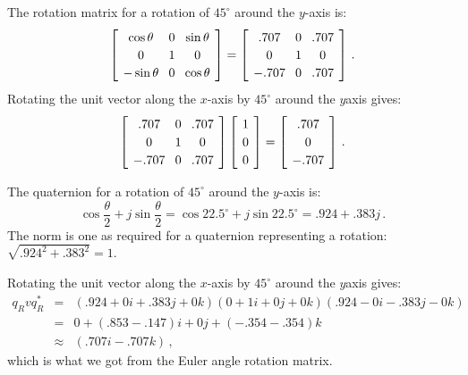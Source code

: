 \documentclass[11pt,a4paper]{report}
\newcommand*{\spacearray}{
\renewcommand{\arraystretch}{1.2}
\setlength{\arraycolsep}{4pt}
}
\begin{document}
\thispagestyle{empty}

The rotation matrix for a rotation of $45^\circ$ around the $y$-axis is:
\[
\spacearray
\left[\begin{array}{ccc}\cos\theta&0&\sin\theta\\0&1&0\\-\sin\theta&0&\cos\theta\\\end{array}\right]
=
\left[\begin{array}{ccc}.707&0&.707\\0&1&0\\-.707&0&.707\\\end{array}\right]\,.
\]
Rotating the unit vector along the $x$-axis by $45^\circ$ around the $y$axis gives:
\[
\spacearray
\left[\begin{array}{ccc}.707&0&.707\\0&1&0\\-.707&0&.707\\\end{array}\right]
\left[
\begin{array}{c}1\\0\\0\\\end{array}
\right]=
\left[
\begin{array}{c}.707\\0\\-.707\\\end{array}
\right]\,.
\]

The quaternion for a rotation of $45^\circ$ around the $y$-axis is:
\[
\cos\frac{\theta}{2} + j\sin\frac{\theta}{2}=\cos 22.5^\circ + j\sin 22.5^\circ= .924+.383j\,.
\]
The norm is one as required for a quaternion representing a rotation:
$\sqrt{.924^2+.383^2}=1$.

Rotating the unit vector along the $x$-axis by $45^\circ$ around the $y$axis gives:
\begin{eqnarray*}
q_R v q_R^*&=&(.924 + 0i+.383j+0k)(0 + 1i + 0j + 0k)(.924-0i-.383j-0k)\\
&=&0 + (.853-.147)i + 0j + (-.354-.354)k\\
&\approx& (.707i - .707k)\,,
\end{eqnarray*}
which is what we got from the Euler angle rotation matrix.
\end{document}
